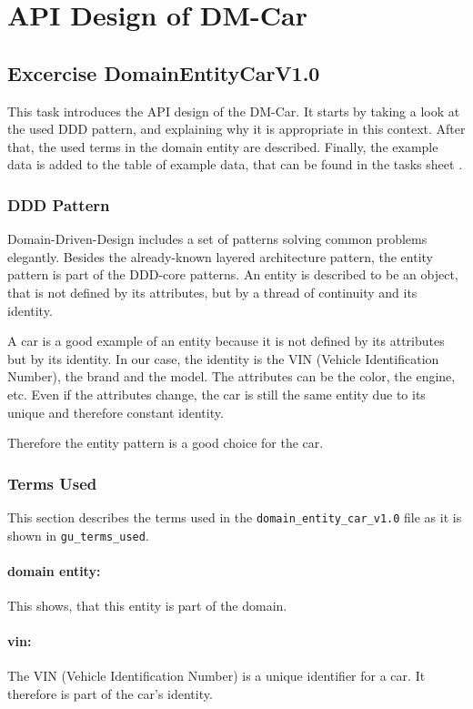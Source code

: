 \section{API Design of DM-Car}
\label{sec:api_design}
\subsection{Excercise DomainEntityCarV1.0}
\label{subsec:domain_entity_car_v1.0}
This task introduces the API design of the DM-Car.
It starts by taking a look at the used DDD pattern, and explaining why it is appropriate in this context.
After that, the used terms in the domain entity are described.
Finally, the example data is added to the table of example data, that can be found in the tasks sheet \cite{CM-T-DMC}.

\subsubsection*{DDD Pattern}
\label{subsubsec:ddd_pattern}
Domain-Driven-Design includes a set of patterns solving common problems elegantly.
Besides the already-known layered architecture pattern, the entity pattern is part of the DDD-core patterns.
An entity is described to be an object, that is not defined by its attributes, but by a thread of continuity and its identity.

A car is a good example of an entity because it is not defined by its attributes but by its identity.
In our case, the identity is the VIN (Vehicle Identification Number), the brand and the model.
The attributes can be the color, the engine, etc.
Even if the attributes change, the car is still the same entity due to its unique and therefore constant identity.

Therefore the entity pattern is a good choice for the car.

\subsubsection*{Terms Used}
This section describes the terms used in the \texttt{domain\_entity\_car\_v1.0} file as it is shown in \texttt{gu\_terms\_used}.
\paragraph*{domain entity:}
This shows, that this entity is part of the domain.
\paragraph*{vin:}
The VIN (Vehicle Identification Number) is a unique identifier for a car.
It therefore is part of the car's identity.
